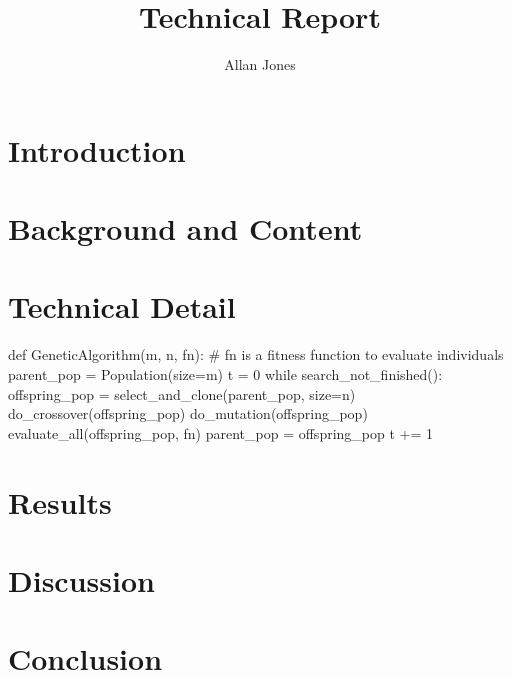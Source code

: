 \documentclass{article}
\title{Technical Report}
\author{Allan Jones}
\begin{document}
	\maketitle

\section{Introduction} %
\label{sec:introduction}


\section{Background and Content} %
\label{sec:background_and_content}


\section{Technical Detail} %
\label{sec:technical_detail}

\begin{center}
\begin{minipage}{5.5in}%
\begin{python}[caption={Standard GA Search in Python},label={code:ec_GA}] 
def GeneticAlgorithm(m, n, fn):
    # fn is a fitness function to evaluate individuals
    parent_pop = Population(size=m)
    t = 0
    while search_not_finished():
        offspring_pop = select_and_clone(parent_pop, size=n)
        do_crossover(offspring_pop)
        do_mutation(offspring_pop)  
        evaluate_all(offspring_pop, fn) 
        parent_pop = offspring_pop
        t += 1
\end{python}
\end{minipage}
\end{center}


\section{Results} %
\label{sec:results}


\section{Discussion} %
\label{sec:discussion}


\section{Conclusion} %
\label{sec:conclusion}

\end{document}
